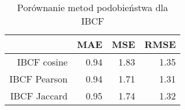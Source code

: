 \begin{table}[ht]
\centering
\begin{tabular}{rrrr}
  \hline
 & MAE & MSE & RMSE \\ 
  \hline
IBCF cosine & 0.94 & 1.83 & 1.35 \\ 
  IBCF Pearson & 0.94 & 1.71 & 1.31 \\ 
  IBCF Jaccard & 0.95 & 1.74 & 1.32 \\ 
   \hline
\end{tabular}
\caption{Porównanie metod podobieństwa dla IBCF} 
\end{table}

